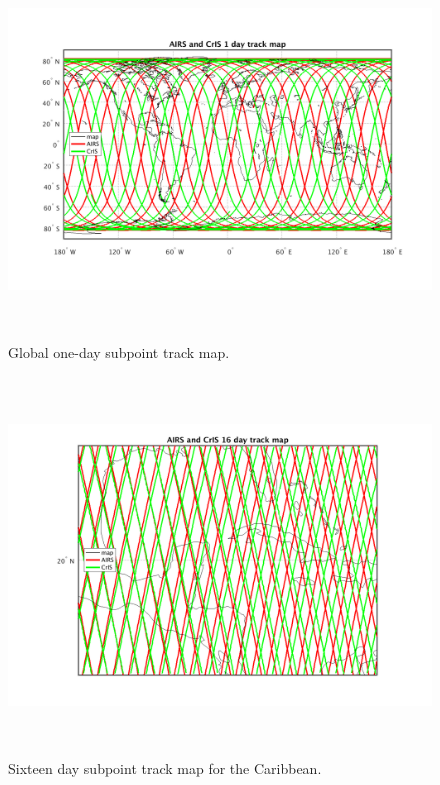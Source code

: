 \documentclass[11pt]{article}
\begin{document}
\begin{figure} %
  \centering
  \includegraphics[height=10cm]{figures/subpt_1_day_all.png}
  \vskip-12mm
  \caption{Global one-day subpoint track map.}
  \label{fig4}
\end{figure}

\begin{figure} %
  \centering
  \includegraphics[height=10cm]{figures/subpt_16_day_zoom.png}
  \vskip-9mm
  \caption{Sixteen day subpoint track map for the Caribbean.}
  \label{fig5}
\end{figure}
\end{document}
